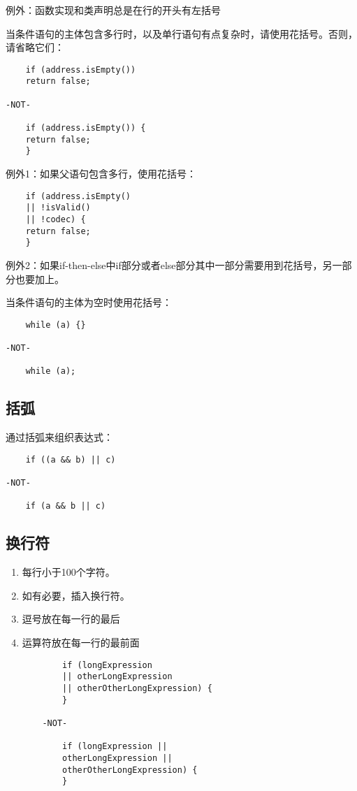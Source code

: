例外：函数实现和类声明总是在行的开头有左括号

当条件语句的主体包含多行时，以及单行语句有点复杂时，请使用花括号。否则，请省略它们：
\begin{lstlisting}
    if (address.isEmpty())
	return false;

-NOT-

	if (address.isEmpty()) {
	return false;
	}

\end{lstlisting}

例外1：如果父语句包含多行，使用花括号：
\begin{lstlisting}
    if (address.isEmpty()
	|| !isValid()
	|| !codec) {
	return false;
	}
\end{lstlisting}

例外2：如果if-then-else中if部分或者else部分其中一部分需要用到花括号，另一部分也要加上。

当条件语句的主体为空时使用花括号：
\begin{lstlisting}
    while (a) {}

-NOT-

	while (a);
\end{lstlisting}

\subsection{括弧}
通过括弧来组织表达式：
\begin{lstlisting}
    if ((a && b) || c)

-NOT-

	if (a && b || c)
\end{lstlisting}

\subsection{换行符}
\begin{enumerate}
	\item 每行小于100个字符。
	\item 如有必要，插入换行符。
	\item 逗号放在每一行的最后
	\item 运算符放在每一行的最前面
	\begin{lstlisting}
		if (longExpression
		|| otherLongExpression
		|| otherOtherLongExpression) {
		}
	
	-NOT-
	
		if (longExpression ||
		otherLongExpression ||
		otherOtherLongExpression) {
		}
	\end{lstlisting}
\end{enumerate}

